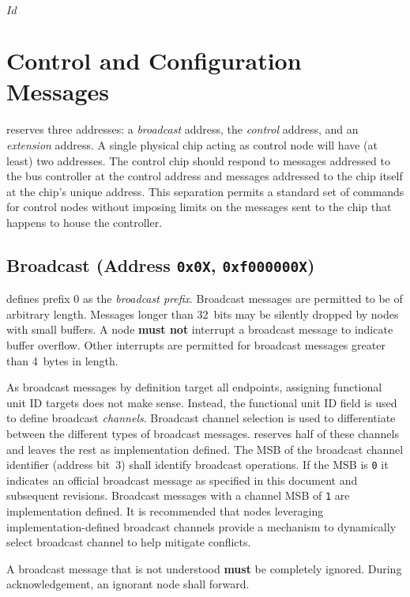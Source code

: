\svnInfo $Id$

\section{Control and Configuration Messages}
\label{sec:control}

\bus reserves three addresses: a {\em broadcast} address, the {\em control}
address, and an {\em extension} address. A single physical chip acting as
control node will have (at least) two addresses. The control chip should
respond to messages addressed to the bus controller at the control address and
messages addressed to the chip itself at the chip's unique address. This
separation permits a standard set of commands for \bus control nodes without
imposing limits on the messages sent to the chip that happens to house the
\bus controller.

\subsection{Broadcast (Address \texttt{0x0X}, \texttt{0xf000000X})}
\label{sec:control-broadcast}
\bus defines prefix 0 as the \textit{broadcast prefix}. Broadcast messages
are permitted to be of arbitrary length. Messages longer than 32~bits may be
silently dropped by nodes with small buffers. A node \textbf{must not}
interrupt a broadcast message to indicate buffer overflow. Other interrupts
are permitted for broadcast messages greater than 4~bytes in length.

As broadcast messages by definition target all endpoints, assigning functional
unit ID targets does not make sense. Instead, the functional unit ID field is
used to define broadcast {\em channels}. Broadcast channel selection is used
to differentiate between the different types of broadcast messages. \bus
reserves half of these channels and leaves the rest as implementation defined.
%
The MSB of the broadcast channel identifier (address bit~3) shall identify
\bus broadcast operations. If the MSB is {\tt 0} it indicates an official \bus
broadcast message as specified in this document and subsequent revisions.
Broadcast messages with a channel MSB of {\tt 1} are implementation defined.
It is recommended that nodes leveraging implementation-defined broadcast
channels provide a mechanism to dynamically select broadcast channel to help
mitigate conflicts.

A broadcast message that is not understood \textbf{must} be completely
ignored. During acknowledgement, an ignorant node shall forward.


